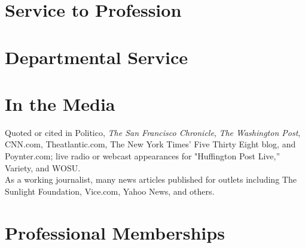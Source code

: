 \documentclass{ncj-vita}
\begin{document}
\section{Service to Profession}



\section{Departmental Service}


\section{In the Media}

Quoted or cited in Politico, \emph{The San Francisco Chronicle}, \emph{The Washington Post}, CNN.com, Theatlantic.com, The New York Times' Five Thirty Eight blog, and Poynter.com; live radio or webcast appearances for "Huffington Post Live,'' Variety, and WOSU. \\

As a working journalist, many news articles published for outlets including The Sunlight Foundation, Vice.com, Yahoo News, and others.

\section{Professional Memberships}

\end{document}
